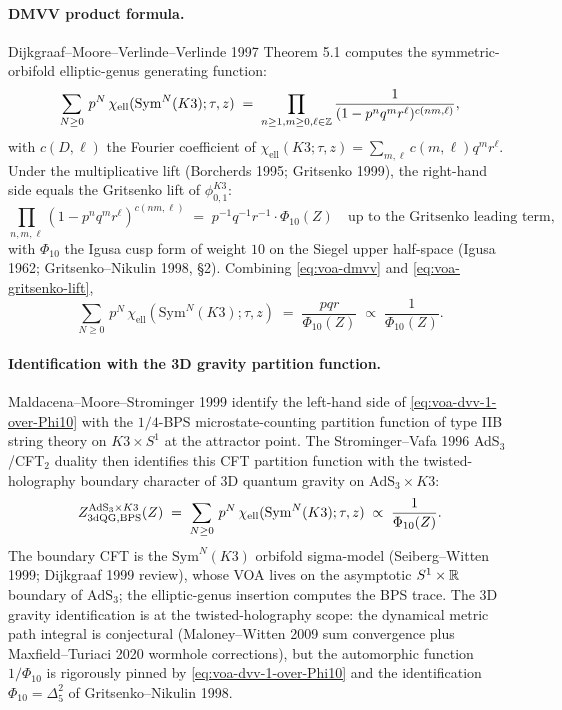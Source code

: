 \paragraph{DMVV product formula.}
Dijkgraaf--Moore--Verlinde--Verlinde 1997 Theorem 5.1 computes the
symmetric-orbifold elliptic-genus generating function:
\begin{equation}
\label{eq:voa-dmvv}
  \sum_{N \geq 0}\,p^N\,\chi_{\mathrm{ell}}(\mathrm{Sym}^N(K3); \tau, z)
  \;=\; \prod_{n \geq 1, m \geq 0, \ell \in \mathbb{Z}}
  \frac{1}{(1 - p^n q^m r^\ell)^{c(nm, \ell)}},
\end{equation}
with $c(D, \ell)$ the Fourier coefficient of
$\chi_{\mathrm{ell}}(K3; \tau, z) = \sum_{m,\ell}c(m,\ell)q^m r^\ell$.
Under the multiplicative lift (Borcherds 1995; Gritsenko 1999), the
right-hand side equals the Gritsenko lift of $\phi^{K3}_{0,1}$:
\begin{equation}
\label{eq:voa-gritsenko-lift}
  \prod_{n,m,\ell}(1 - p^n q^m r^\ell)^{c(nm,\ell)}
  \;=\; p^{-1}q^{-1}r^{-1}\cdot\Phi_{10}(Z)
  \quad \text{up to the Gritsenko leading term,}
\end{equation}
with $\Phi_{10}$ the Igusa cusp form of weight $10$ on the Siegel upper
half-space (Igusa 1962; Gritsenko--Nikulin 1998, \S2). Combining
\eqref{eq:voa-dmvv} and \eqref{eq:voa-gritsenko-lift},
\begin{equation}
\label{eq:voa-dvv-1-over-Phi10}
  \sum_{N \geq 0}\,p^N\,\chi_{\mathrm{ell}}(\mathrm{Sym}^N(K3); \tau, z)
  \;=\; \frac{p q r}{\Phi_{10}(Z)}
  \;\propto\; \frac{1}{\Phi_{10}(Z)}.
\end{equation}

\paragraph{Identification with the 3D gravity partition function.}
Maldacena--Moore--Strominger 1999 identify the left-hand side of
\eqref{eq:voa-dvv-1-over-Phi10} with the $1/4$-BPS microstate-counting
partition function of type IIB string theory on $K3 \times S^1$ at
the attractor point. The Strominger--Vafa 1996 AdS$_3$/CFT$_2$
duality then identifies this CFT partition function with the
twisted-holography boundary character of 3D quantum gravity on
$\mathrm{AdS}_3 \times K3$:
\begin{equation}
\label{eq:voa-3dqg-partition}
  Z^{\mathrm{AdS}_3 \times K3}_{\mathrm{3dQG, BPS}}(Z) \;=\;
  \sum_{N \geq 0}\,p^N\,\chi_{\mathrm{ell}}(\mathrm{Sym}^N(K3); \tau, z)
  \;\propto\; \frac{1}{\Phi_{10}(Z)}.
\end{equation}
The boundary CFT is the $\mathrm{Sym}^N(K3)$ orbifold sigma-model
(Seiberg--Witten 1999; Dijkgraaf 1999 review), whose VOA lives on the
asymptotic $S^1 \times \mathbb{R}$ boundary of $\mathrm{AdS}_3$; the
elliptic-genus insertion computes the BPS trace. The $3$D gravity
identification is at the twisted-holography scope: the dynamical
metric path integral is conjectural (Maloney--Witten 2009
sum convergence plus Maxfield--Turiaci 2020 wormhole corrections),
but the automorphic function $1/\Phi_{10}$ is rigorously pinned by
\eqref{eq:voa-dvv-1-over-Phi10} and the identification
$\Phi_{10} = \Delta_5^2$ of Gritsenko--Nikulin 1998.

